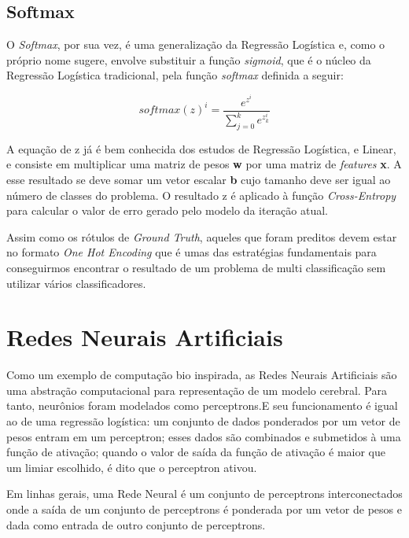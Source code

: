 \documentclass[conference]{IEEEtran}
\begin{document}
\subsection{Softmax}

O \textit{Softmax}, por sua vez, é uma generalização da Regressão Logística e, como o próprio nome sugere, envolve substituir a função \textit{sigmoid}, que é o núcleo da Regressão Logística tradicional, pela função \textit{softmax} definida a seguir:

\begin{equation*}
 \textit{softmax}(z)^i = \frac{e^{z^i}}{\sum\limits_{j=0}^k e^{z_k^i}  }
\end{equation*}

A equação de z já é bem conhecida dos estudos de Regressão Logística, e Linear, e consiste em multiplicar uma matriz de pesos \textbf{w} por uma matriz de \textit{features} \textbf{x}. A esse resultado se deve somar um vetor escalar \textbf{b} cujo tamanho deve ser igual ao número de classes do problema. O resultado z é aplicado à função \textit{Cross-Entropy} para calcular o valor de erro gerado pelo modelo da iteração atual.\par
 Assim como os rótulos de \textit{Ground Truth}, aqueles que foram preditos devem estar no formato \textit{One Hot Encoding} que é umas das estratégias fundamentais para conseguirmos encontrar o resultado de um problema de multi classificação sem utilizar vários classificadores.




\section{Redes Neurais Artificiais}

	Como um exemplo de computação bio inspirada, as Redes Neurais Artificiais são uma abstração computacional para representação de um modelo cerebral. Para tanto, neurônios foram modelados como perceptrons.E seu funcionamento é igual ao de uma regressão logística: um conjunto de dados ponderados por um vetor de pesos entram em um perceptron; esses dados são combinados e submetidos à uma função de ativação; quando o valor de saída da função de ativação é maior que um limiar escolhido, é dito que o perceptron ativou. 
	
  
  Em linhas gerais, uma Rede Neural é um conjunto de perceptrons interconectados onde a saída de um conjunto de perceptrons é ponderada por um vetor de pesos e dada como entrada de outro conjunto de perceptrons. 
  
\end{document}
